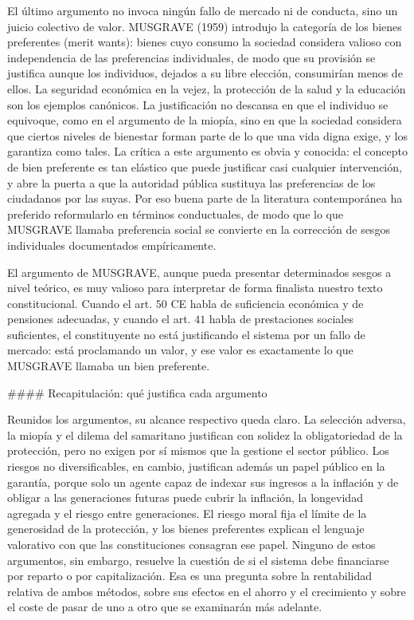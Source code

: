 \documentclass[10pt,a4paper]{article}
\begin{document}
El último argumento no invoca ningún fallo de mercado ni de conducta, sino un juicio colectivo de valor. MUSGRAVE (1959) introdujo la categoría de los bienes preferentes (merit wants): bienes cuyo consumo la sociedad considera valioso con independencia de las preferencias individuales, de modo que su provisión se justifica aunque los individuos, dejados a su libre elección, consumirían menos de ellos. La seguridad económica en la vejez, la protección de la salud y la educación son los ejemplos canónicos. La justificación no descansa en que el individuo se equivoque, como en el argumento de la miopía, sino en que la sociedad considera que ciertos niveles de bienestar forman parte de lo que una vida digna exige, y los garantiza como tales. La crítica a este argumento es obvia y conocida: el concepto de bien preferente es tan elástico que puede justificar casi cualquier intervención, y abre la puerta a que la autoridad pública sustituya las preferencias de los ciudadanos por las suyas. Por eso buena parte de la literatura contemporánea ha preferido reformularlo en términos conductuales, de modo que lo que MUSGRAVE llamaba preferencia social se convierte en la corrección de sesgos individuales documentados empíricamente. 

El argumento de MUSGRAVE, aunque pueda presentar determinados sesgos a nivel teórico, es muy valioso para interpretar de forma finalista nuestro texto constitucional. Cuando el art. $50$ CE habla de suficiencia económica y de pensiones adecuadas, y cuando el art. $41$ habla de prestaciones sociales suficientes, el constituyente no está justificando el sistema por un fallo de mercado: está proclamando un valor, y ese valor es exactamente lo que MUSGRAVE llamaba un bien preferente.

#### Recapitulación: qué justifica cada argumento

Reunidos los argumentos, su alcance respectivo queda claro. La selección adversa, la miopía y el dilema del samaritano justifican con solidez la obligatoriedad de la protección, pero no exigen por sí mismos que la gestione el sector público. Los riesgos no diversificables, en cambio, justifican además un papel público en la garantía, porque solo un agente capaz de indexar sus ingresos a la inflación y de obligar a las generaciones futuras puede cubrir la inflación, la longevidad agregada y el riesgo entre generaciones. El riesgo moral fija el límite de la generosidad de la protección, y los bienes preferentes explican el lenguaje valorativo con que las constituciones consagran ese papel. Ninguno de estos argumentos, sin embargo, resuelve la cuestión de si el sistema debe financiarse por reparto o por capitalización. Esa es una pregunta sobre la rentabilidad relativa de ambos métodos, sobre sus efectos en el ahorro y el crecimiento y sobre el coste de pasar de uno a otro que se examinarán más adelante.
\end{document}
